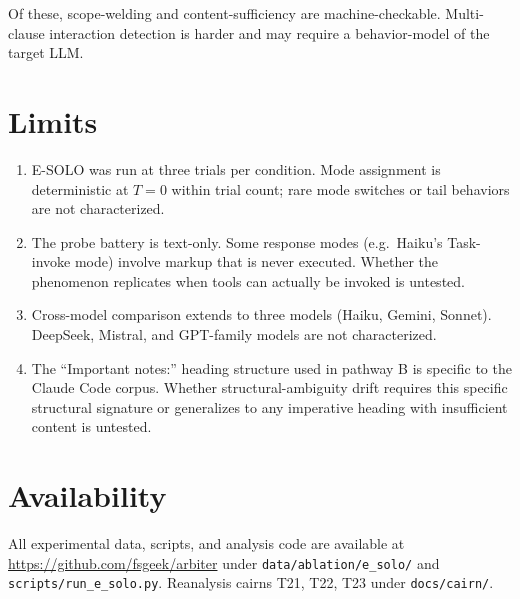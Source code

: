 \documentclass[11pt,a4paper]{article}
\begin{document}
Of these, scope-welding and content-sufficiency are
machine-checkable. Multi-clause interaction detection is harder
and may require a behavior-model of the target LLM.

\section{Limits}

\begin{enumerate}[leftmargin=*]
\item E-SOLO was run at three trials per condition. Mode assignment
is deterministic at $T=0$ within trial count; rare mode switches
or tail behaviors are not characterized.

\item The probe battery is text-only. Some response modes
(e.g.~Haiku's Task-invoke mode) involve markup that is never
executed. Whether the phenomenon replicates when tools can actually
be invoked is untested.

\item Cross-model comparison extends to three models (Haiku, Gemini,
Sonnet). DeepSeek, Mistral, and GPT-family models are not characterized.

\item The ``Important notes:'' heading structure used in pathway B
is specific to the Claude Code corpus. Whether structural-ambiguity
drift requires this specific structural signature or generalizes
to any imperative heading with insufficient content is untested.
\end{enumerate}

\section*{Availability}

All experimental data, scripts, and analysis code are available at
\url{https://github.com/fsgeek/arbiter} under
\texttt{data/ablation/e\_solo/} and \texttt{scripts/run\_e\_solo.py}.
Reanalysis cairns T21, T22, T23 under \texttt{docs/cairn/}.


\end{document}
